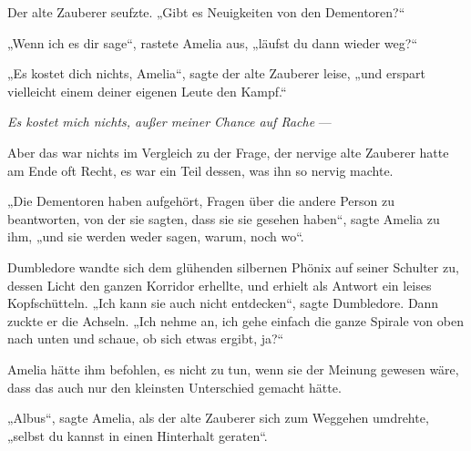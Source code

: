 Der alte Zauberer seufzte.
„Gibt es Neuigkeiten von den Dementoren?“

„Wenn ich es dir sage“, rastete Amelia aus, „läufst du dann wieder weg?“

„Es kostet dich nichts, Amelia“, sagte der alte Zauberer leise, „und erspart vielleicht einem deiner eigenen Leute den Kampf.“

\emph{Es kostet mich nichts, außer meiner Chance auf Rache} —

Aber das war nichts im Vergleich zu der Frage, der nervige alte Zauberer hatte am Ende oft Recht, es war ein Teil dessen, was ihn so nervig machte.

„Die Dementoren haben aufgehört, Fragen über die andere Person zu beantworten, von der sie sagten, dass sie sie gesehen haben“, sagte Amelia zu ihm, „und sie werden weder sagen, warum, noch wo“.

Dumbledore wandte sich dem glühenden silbernen Phönix auf seiner Schulter zu, dessen Licht den ganzen Korridor erhellte, und erhielt als Antwort ein leises Kopfschütteln.
„Ich kann sie auch nicht entdecken“, sagte Dumbledore. Dann zuckte er die Achseln.
„Ich nehme an, ich gehe einfach die ganze Spirale von oben nach unten und schaue, ob sich etwas ergibt, ja?“

Amelia hätte ihm befohlen, es nicht zu tun, wenn sie der Meinung gewesen wäre, dass das auch nur den kleinsten Unterschied gemacht hätte.

„Albus“, sagte Amelia, als der alte Zauberer sich zum Weggehen umdrehte, „selbst du kannst in einen Hinterhalt geraten“.

